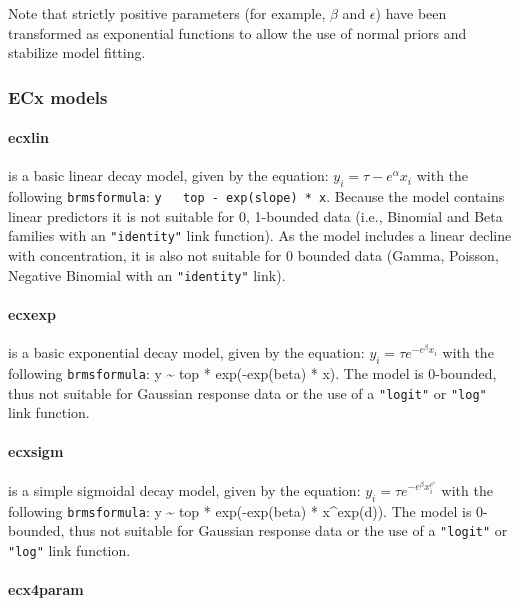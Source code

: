 \documentclass[
  shortnames]{jss}
\begin{document}
Note that strictly positive parameters (for example, \(\beta\) and \(\epsilon\)) have been transformed as exponential functions to allow the use of normal priors and stabilize model fitting.

\subsubsection[ECx models]{ECx models}\label{ecx-models}

\hypertarget{ecxlin}{%
\paragraph{ecxlin}\label{ecxlin}}

is a basic linear decay model, given by the equation:
\(y_i = \tau - e^{\alpha} x_i\)
with the following \texttt{brmsformula}: \texttt{y ~ top - exp(slope) * x}. Because the model contains linear predictors it is not suitable for 0, 1-bounded data (i.e., Binomial and Beta families with an \texttt{"identity"} link function). As the model includes a linear decline with concentration, it is also not suitable for 0 bounded data (Gamma, Poisson, Negative Binomial with an \texttt{"identity"} link).

\hypertarget{ecxexp}{%
\paragraph{ecxexp}\label{ecxexp}}

is a basic exponential decay model, given by the equation: \(y_i = \tau e^{-e^{\beta} x_i}\)
with the following \texttt{brmsformula}: y \textasciitilde{} top * exp(-exp(beta) * x). The model is 0-bounded, thus not suitable for Gaussian response data or the use of a \texttt{"logit"} or \texttt{"log"} link function.

\hypertarget{ecxsigm}{%
\paragraph{ecxsigm}\label{ecxsigm}}

is a simple sigmoidal decay model, given by the equation:
\(y_i = \tau e^{-e^{\beta} x_i^{e^\epsilon}}\)
with the following \texttt{brmsformula}: y \textasciitilde{} top * exp(-exp(beta) * x\^{}exp(d)). The model is 0-bounded, thus not suitable for Gaussian response data or the use of a \texttt{"logit"} or \texttt{"log"} link function.

\hypertarget{ecx4param}{%
\paragraph{ecx4param}\label{ecx4param}}
\end{document}
